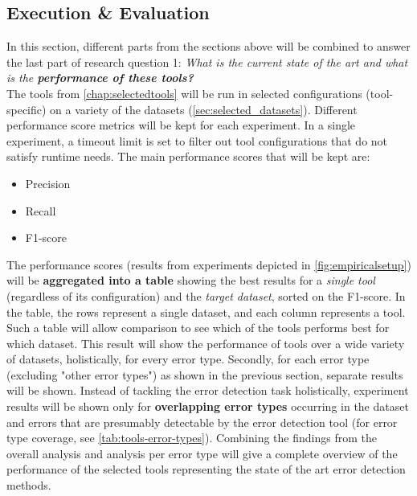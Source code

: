 \subsection{Execution \& Evaluation}
In this section, different parts from the sections above will be combined to answer the last part of research question 1: \textit{What is the current state of the art and what is the \textbf{performance of these tools?}}
~\\The tools from \autoref{chap:selectedtools} will be run in selected configurations (tool-specific) on a variety of the datasets (\autoref{sec:selected_datasets}). Different performance score metrics will be kept for each experiment. In a single experiment, a timeout limit is set to filter out tool configurations that do not satisfy runtime needs. The main performance scores that will be kept are:
\begin{itemize}
    \item Precision
    \item Recall
    \item F1-score
\end{itemize}

The performance scores (results from experiments depicted in \autoref{fig:empiricalsetup}) will be \textbf{aggregated into a table} showing the best results for a \textit{single tool} (regardless of its configuration) and the \textit{target dataset}, sorted on the F1-score. In the table, the rows represent a single dataset, and each column represents a tool. Such a table will allow comparison to see which of the tools performs best for which dataset. This result will show the performance of tools over a wide variety of datasets, holistically, for every error type.
Secondly, for each error type (excluding "other error types") as shown in the previous section, separate results will be shown. Instead of tackling the error detection task holistically, experiment results will be shown only for \textbf{overlapping error types} occurring in the dataset and errors that are presumably detectable by the error detection tool (for error type coverage, see \autoref{tab:tools-error-types}).
Combining the findings from the overall analysis and analysis per error type will give a complete overview of the performance of the selected tools representing the state of the art error detection methods. 

